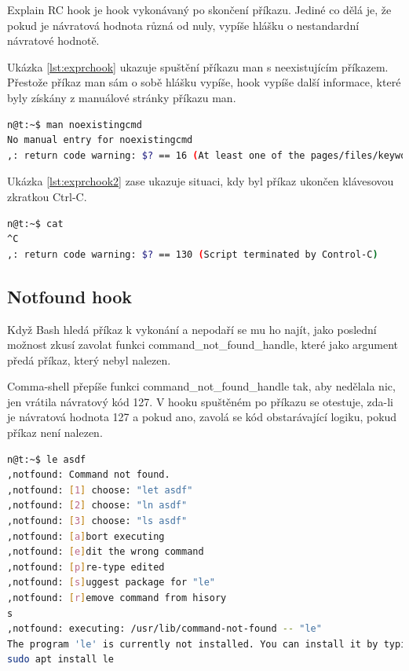 \documentclass[thesis=M,czech]{FITthesis}[2012/06/26]
\begin{document}
Explain RC hook je hook vykonávaný po skončení příkazu. Jediné co dělá je, že pokud je návratová hodnota různá od nuly, vypíše hlášku o nestandardní návratové hodnotě.

Ukázka \ref{lst:exprchook} ukazuje spuštění příkazu man s neexistujícím příkazem. Přestože příkaz man sám o sobě hlášku vypíše, hook vypíše další informace, které byly získány z manuálové stránky příkazu man.

\begin{minipage}{\linewidth}
\begin{lstlisting}[language=bash, caption={Explain RC hook}, label={lst:exprchook}]
n@t:~$ man noexistingcmd
No manual entry for noexistingcmd
,: return code warning: $? == 16 (At least one of the pages/files/keywords didn't exist or wasn't matched.)
\end{lstlisting}
\end{minipage}

Ukázka \ref{lst:exprchook2} zase ukazuje situaci, kdy byl příkaz ukončen klávesovou zkratkou Ctrl-C.

\begin{minipage}{\linewidth}
\begin{lstlisting}[language=bash, caption={Explain RC hook}, label={lst:exprchook2}]
n@t:~$ cat
^C
,: return code warning: $? == 130 (Script terminated by Control-C)
\end{lstlisting}
\end{minipage}


\subsection{Notfound hook}

Když Bash hledá příkaz k vykonání a nepodaří se mu ho najít, jako poslední možnost zkusí zavolat funkci command\_not\_found\_handle, které jako argument předá příkaz, který nebyl nalezen.

Comma-shell přepíše funkci command\_not\_found\_handle tak, aby nedělala nic, jen vrátila návratový kód 127. V hooku spuštěném po příkazu se otestuje, zda-li je návratová hodnota 127 a pokud ano, zavolá se kód obstarávající logiku, pokud příkaz není nalezen.

\begin{minipage}{\linewidth}
\begin{lstlisting}[language=bash, caption={Explain RC hook}, label={lst:notfoundhook}]
n@t:~$ le asdf
,notfound: Command not found.
,notfound: [1] choose: "let asdf"
,notfound: [2] choose: "ln asdf"
,notfound: [3] choose: "ls asdf"
,notfound: [a]bort executing
,notfound: [e]dit the wrong command
,notfound: [p]re-type edited
,notfound: [s]uggest package for "le"
,notfound: [r]emove command from hisory
s
,notfound: executing: /usr/lib/command-not-found -- "le"
The program 'le' is currently not installed. You can install it by typing:
sudo apt install le
\end{lstlisting}
\end{minipage}
\end{document}
